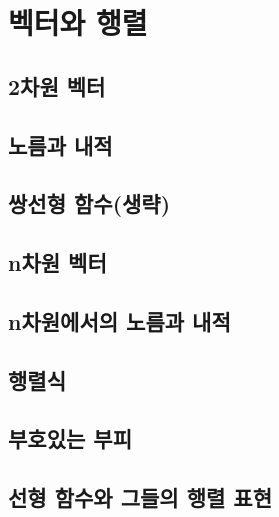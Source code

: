 \section{벡터와 행렬}
\subsection{2차원 벡터}


\subsection{노름과 내적}

\subsection{쌍선형 함수(생략)}

\subsection{n차원 벡터}

\subsection{n차원에서의 노름과 내적}

\subsection{행렬식}

\subsection{부호있는 부피}

\subsection{선형 함수와 그들의 행렬 표현}
